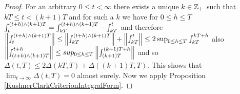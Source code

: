 \begin{proof}
For an arbitrary $0 \leq t < \infty$ there exists a unique $k \in \mathbb{Z}_+$ such that $kT \leq t < (k+1)T$ and for such a $k$ we have for $0 \leq h \leq T$  
$\int_t^{(t+h) \wedge (k+1)T} = \int_{kT}^{(t+h) \wedge (k+1)T} - \int_{kT}^t$ and therefore $\left \lVert \int_t^{(t+h) \wedge (k+1)T} \right \rVert \leq \left \lVert \int_{kT}^{(t+h) \wedge (k+1)T} \right \rVert + \left \lVert \int_{kT}^t \right \rVert \leq 2 \sup_{0 \leq h \leq T} \int_{kT}^{kT+h}$ also
$\left \lVert \int_{(t+h) \wedge (k+1)T}^{t+h} \right \rVert \leq sup_{0 \leq h \leq T}\left \lVert \int_{(k+1)T}^{(k+1)T+h} \right \rVert$ and so $\Delta(t,T) \leq 2 \Delta(kT, T) + \Delta((k+1)T,T)$.  This shows that 
$\lim_{t \to \infty} \Delta(t,T) = 0$ almost surely.  Now we apply Proposition \ref{KushnerClarkCriterionIntegralForm}.
\end{proof}